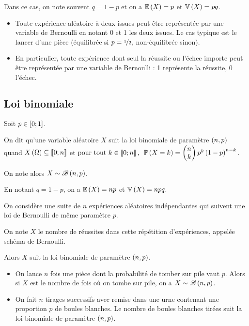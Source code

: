 Dans ce cas, on note souvent \(q=1-p\) et on a \(\operatorname{\mathbb{E}}\left(X\right)=p\) et \(\operatorname{\mathbb{V}}\left(X\right)=pq\).

\begin{ex}
\begin{itemize}
    \item Toute expérience aléatoire à deux issues peut être représentée par une variable de Bernoulli en notant 0 et 1 les deux issues. Le cas typique est le lancer d'une pièce (équilibrée si \(p=\nicefrac{1}{2}\), non-équilibrée sinon). \\
    \item En particulier, toute expérience dont seul la réussite ou l'échec importe peut être représentée par une variable de Bernoulli : 1 représente la réussite, 0 l'échec.
\end{itemize}
\end{ex}

\subsection{Loi binomiale}

\begin{defi}
Soit \(p\in\left[0;1\right]\).

On dit qu'une variable aléatoire \(X\) suit la loi binomiale de paramètre \(\left(n,p\right)\) quand \(X\left(\Omega\right)\subseteq\left\llbracket0;n\right\rrbracket\) et \(\quantifs{\tpt k\in\interventierii{0}{n}}\proba{X=k}=\binom{k}{n}p^k\paren{1-p}^{n-k}\).

On note alors \(X\sim\mathscr{B}\left(n,p\right)\).
\end{defi}

En notant \(q=1-p\), on a \(\operatorname{\mathbb{E}}\left(X\right)=np\) et \(\operatorname{\mathbb{V}}\left(X\right)=npq\).

\begin{prop}
On considère une suite de \(n\) expériences aléatoires indépendantes qui suivent une loi de Bernoulli de même paramètre \(p\).

On note \(X\) le nombre de réussites dans cette répétition d'expériences, appelée schéma de Bernoulli.

Alors \(X\) suit la loi binomiale de paramètre \(\left(n,p\right)\).
\end{prop}

\begin{ex}
\begin{itemize}
    \item On lance \(n\) fois une pièce dont la probabilité de tomber sur pile vaut \(p\). Alors si \(X\) est le nombre de fois où on tombe sur pile, on a \(X\sim\mathscr{B}\left(n,p\right)\). \\
    \item On fait \(n\) tirages successifs avec remise dans une urne contenant une proportion \(p\) de boules blanches. Le nombre de boules blanches tirées suit la loi binomiale de paramètre \(\left(n,p\right)\).
\end{itemize}
\end{ex}

